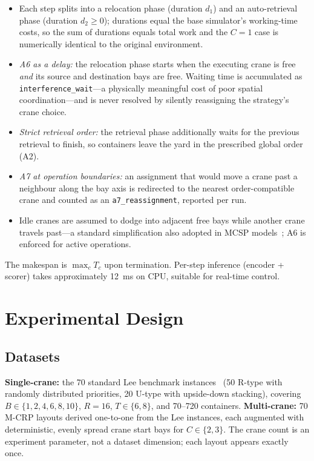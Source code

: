 \documentclass[11pt,a4paper]{elsarticle}
\begin{document}
\begin{itemize}
    \item Each step splits into a relocation phase (duration $d_1$) and an auto-retrieval phase (duration $d_2 \ge 0$); durations equal the base simulator's working-time costs, so the sum of durations equals total work and the $C=1$ case is numerically identical to the original environment.
    \item \emph{A6 as a delay:} the relocation phase starts when the executing crane is free \emph{and} its source and destination bays are free. Waiting time is accumulated as \texttt{interference\_wait}---a physically meaningful cost of poor spatial coordination---and is never resolved by silently reassigning the strategy's crane choice.
    \item \emph{Strict retrieval order:} the retrieval phase additionally waits for the previous retrieval to finish, so containers leave the yard in the prescribed global order (A2).
    \item \emph{A7 at operation boundaries:} an assignment that would move a crane past a neighbour along the bay axis is redirected to the nearest order-compatible crane and counted as an \texttt{a7\_reassignment}, reported per run.
    \item Idle cranes are assumed to dodge into adjacent free bays while another crane travels past---a standard simplification also adopted in MCSP models~\cite{shinkim2025}; A6 is enforced for active operations.
\end{itemize}

The makespan is $\max_c T_c$ upon termination. Per-step inference (encoder + scorer) takes approximately 12~ms on CPU, suitable for real-time control.

\section{Experimental Design}
\label{sec:experiments}

\subsection{Datasets}

\textbf{Single-crane:} the 70 standard Lee benchmark instances~\cite{lee2010} (50 R-type with randomly distributed priorities, 20 U-type with upside-down stacking), covering $B\in\{1,2,4,6,8,10\}$, $R=16$, $T\in\{6,8\}$, and 70--720 containers. \textbf{Multi-crane:} 70 M-CRP layouts derived one-to-one from the Lee instances, each augmented with deterministic, evenly spread crane start bays for $C \in \{2,3\}$. The crane count is an experiment parameter, not a dataset dimension; each layout appears exactly once.
\end{document}
